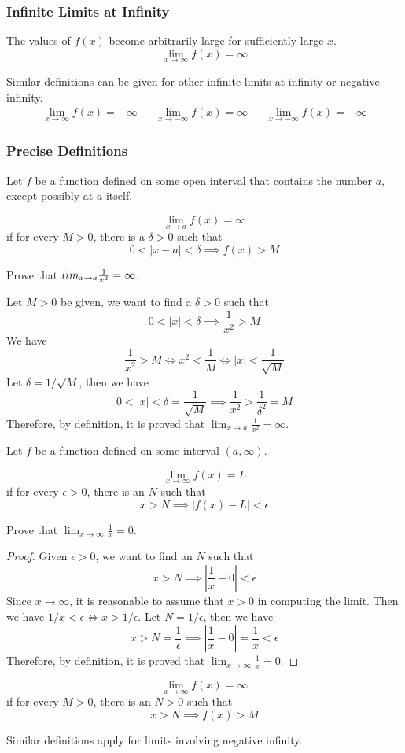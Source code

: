 \subsubsection*{Infinite Limits at Infinity}
\begin{definition}
    The values of \(f(x)\) become arbitrarily large for sufficiently large
    \(x\).
    \[\lim_{x\to\infty}f(x)=\infty\]
\end{definition}
Similar definitions can be given for other infinite limits at infinity or
negative infinity.
\begin{align*}
    &\lim_{x\to\infty}f(x)=-\infty && \lim_{x\to -\infty}f(x)=\infty &
    & \lim_{x\to -\infty}f(x)=-\infty&
\end{align*}

\subsubsection*{Precise Definitions}
Let \(f\) be a function defined on some open interval that contains the number
\(a\), except possibly at \(a\) itself.
\begin{definition}
    \[\lim_{x\to a}f(x)=\infty\]
    if for every \(M>0\), there is a
    \(\delta>0\) such that
    \[0<|x-a|<\delta\implies f(x)>M\]
\end{definition}
\begin{problem}
    Prove that \(\\lim_{x\to a}\frac{1}{x^2}=\infty\).
\end{problem}
\begin{solution}
    Let \(M>0\) be given, we want to find a \(\delta>0\) such that
    \[0<|x|<\delta\implies\frac{1}{x^2}>M\]
    We have
    \[\frac{1}{x^2}>M\iff x^2<\frac{1}{M}\iff|x|<\frac{1}{\sqrt{M}}\]
    Let \(\delta=1/\sqrt{M}\), then we have
    \[0<|x|<\delta=\frac{1}{\sqrt{M}}\implies\frac{1}{x^2}
    >\frac{1}{\delta^2}=M\]
    Therefore, by definition, it is proved that
    \(\displaystyle{\lim_{x\to a}\frac{1}{x^2}=\infty}\).
\end{solution}
Let \(f\) be a function defined on some interval \((a,\infty)\).
\begin{definition}
    \[\lim_{x\to \infty}f(x)=L\]
    if for every \(\epsilon>0\), there is an
    \(N\) such that
    \[x>N\implies|f(x)-L|<\epsilon\]
\end{definition}
\begin{problem}
    Prove that \(\lim_{x\to \infty}\frac{1}{x}=0\).
\end{problem}
\begin{proof}
    Given \(\epsilon>0\), we want to find an \(N\) such that
    \[x>N\implies\left|\frac{1}{x}-0\right|<\epsilon\]
    Since \(x\to \infty\), it is reasonable to assume that \(x>0\) in
    computing the limit.
    Then we have \(1/x<\epsilon\iff x>1/\epsilon\).
    Let \(N=1/\epsilon\), then we have
    \[x>N=\frac{1}{\epsilon}\implies\left|\frac{1}{x}-0\right|=\frac{1}{x}
    <\epsilon\]
    Therefore, by definition, it is proved that
    \(\displaystyle{\lim_{x\to \infty}\frac{1}{x}=0}\).
\end{proof}
\begin{definition}
    \[\lim_{x\to \infty}f(x)=\infty\] if for every \(M>0\), there is an
    \(N>0\) such that \[x>N\implies f(x)>M\]
\end{definition}
Similar definitions apply for limits involving negative infinity.